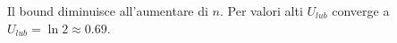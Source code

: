 \documentclass[12pt]{article}
\begin{document}
\begin{table}[H]
    \centering
    \qquad
    \caption{Valori di $U_{lub}$ per RM al variare di n} 
\end{table}
\noindent
Il bound diminuisce all'aumentare di $n$. Per valori alti $U_{lub}$ converge a $U_{lub} = \ln 2 \approx 0.69$. 
\end{document}
